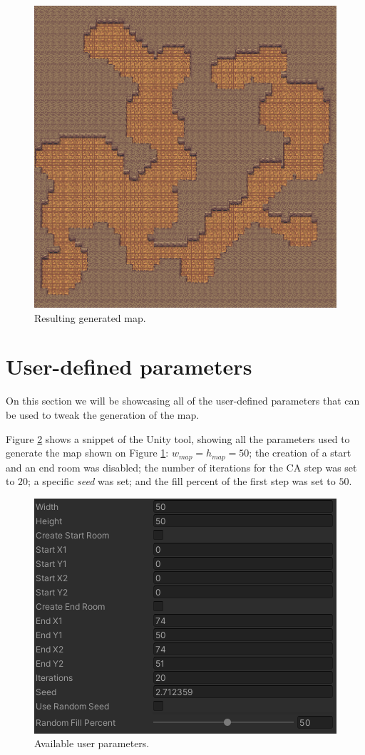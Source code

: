\begin{figure}[h]
    \caption{Resulting generated map.}
    \centerline{\includegraphics{images/development/final_result.png}}
    \label{fig:map_result}
\end{figure}

\section{User-defined parameters}

On this section we will be showcasing all of the user-defined parameters that can be used to tweak the generation of the map.

Figure \ref{fig:user_par} shows a snippet of the Unity tool, showing all the parameters used to generate the map shown on Figure \ref{fig:map_result}: \(w_{map} = h_{map} = 50\); the creation of a start and an end room was disabled; the number of iterations for the CA step was set to \(20\); a specific \emph{seed} was set; and the fill percent of the first step was set to \(50\). 

\begin{figure}[h]
    \caption{Available user parameters.}
    \centerline{\includegraphics{images/development/user_parameters.png}}
    \label{fig:user_par}
\end{figure}